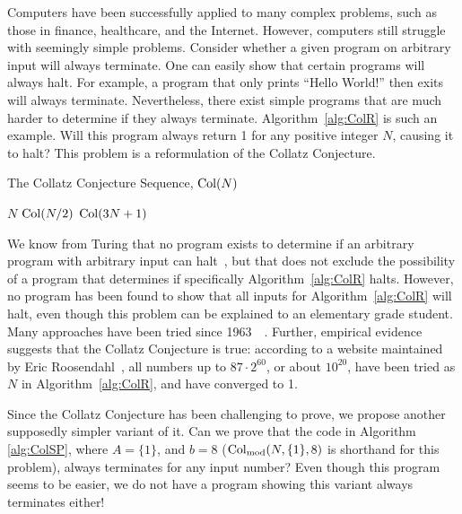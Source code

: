 Computers have been successfully applied to many complex problems, such as those in finance, healthcare, and the Internet. However, computers still struggle with seemingly simple problems. Consider whether a given program on arbitrary input will always terminate. One can easily show that certain programs will always halt. For example, a program that only prints ``Hello World!'' then exits will always terminate. Nevertheless, there exist simple programs that are much harder to determine if they always terminate. Algorithm~\ref{alg:ColR} is such an example. Will this program always return 1 for any positive integer $N$, causing it to
halt? This problem is a reformulation of the Collatz Conjecture. \par
\begin{algorithm} 
\caption{The Collatz Conjecture Sequence, $\mathrm{Col}(N)$}
\label{alg:ColR} 
\begin{algorithmic}[1]
     \Return $N$ 
    \EndIf
     \Return $\mathrm{Col}(N/2)$
    \EndIf
    \State \Return $\mathrm{Col}(3N + 1)$ 
\end{algorithmic}
\end{algorithm}
We know from Turing that no program exists to determine if an arbitrary program with arbitrary input can halt~\cite{Turing1936}, but that does not exclude the possibility of a program that determines if specifically Algorithm~\ref{alg:ColR} halts. However, no program has been found to show that all inputs for Algorithm~\ref{alg:ColR} will halt, even though this problem can be explained to an elementary grade student. Many approaches have been tried since 1963~\cite{2003mathLagrais}~\cite{2006mathLagrias}. Further, empirical evidence suggests that the Collatz Conjecture is true: according to a website maintained by Eric Roosendahl~\cite{EricRoose}, all numbers up to $87 \cdot 2^{60}$, or about $10^{20}$, have been tried as $N$ in Algorithm~\ref{alg:ColR}, and have converged to 1. \par
Since the Collatz Conjecture has been challenging to prove, we propose another supposedly simpler variant of it. Can we prove that the code in Algorithm \ref{alg:ColSP}, where $A = \{1\}$, and $b = 8$ ($\mathrm{Col}_{\text{mod}}(N,\{1\},8)$ is shorthand for this problem), always terminates for any input number? Even though this program seems to be easier, we do not have a program showing this variant always terminates either! \par
